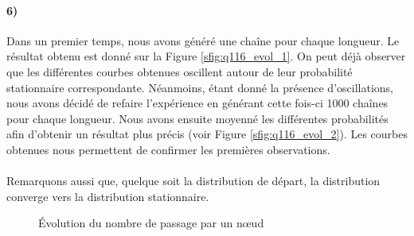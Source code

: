 \documentclass[a4paper,titlepage]{report}
\begin{document}
\paragraph{6)} Dans un premier temps, nous avons généré une chaîne pour chaque longueur. Le résultat obtenu est donné sur la Figure \ref{sfig:q116_evol_1}. On peut déjà observer que les différentes courbes obtenues oscillent autour de leur probabilité stationnaire correspondante. Néanmoins, étant donné la présence d'oscillations, nous avons décidé de refaire l'expérience en générant cette fois-ci 1000 chaînes pour chaque longueur. Nous avons ensuite moyenné les différentes probabilités afin d'obtenir un résultat plus précis (voir Figure \ref{sfig:q116_evol_2}). Les courbes obtenues nous permettent de confirmer les premières observations.
\paragraph{}
Remarquons aussi que, quelque soit la distribution de départ, la distribution converge vers la distribution stationnaire.
\begin{figure}[h]
	\center
	\caption{Évolution du nombre de passage par un nœud}
\end{figure}
\end{document}
